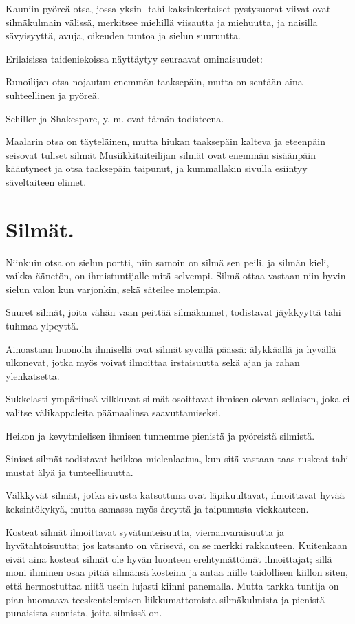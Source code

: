 \documentclass[11pt, twoside, finnish, a5paper]{book}
\begin{document}
Kauniin pyöreä otsa, jossa yksin- tahi kaksinkertaiset
pystysuorat viivat ovat silmäkulmain välissä, merkitsee
miehillä viisautta ja miehuutta, ja naisilla sävyisyyttä,
avuja, oikeuden tuntoa ja sielun suuruutta.

Erilaisissa taideniekoissa näyttäytyy seuraavat ominaisuudet:

Runoilijan otsa nojautuu enemmän taaksepäin, mutta on
sentään aina suhteellinen ja pyöreä.

Schiller ja Shakespare, y. m. ovat tämän todisteena.

Maalarin otsa on täyteläinen, mutta hiukan taaksepäin
kalteva ja eteenpäin seisovat tuliset silmät
Musiikkitaiteilijan silmät ovat enemmän
 sisäänpäin
kääntyneet ja otsa taaksepäin taipunut, ja kummallakin
sivulla esiintyy säveltaiteen elimet.

\chapter*{Silmät.}

Niinkuin otsa on sielun portti, niin samoin on silmä
sen peili, ja silmän kieli, vaikka äänetön, on
ihmistuntijalle mitä selvempi. Silmä ottaa vastaan niin hyvin
sielun valon kun varjonkin, sekä säteilee molempia.

Suuret silmät, joita vähän vaan peittää silmäkannet,
todistavat jäykkyyttä tahi tuhmaa ylpeyttä.

Ainoastaan huonolla ihmisellä ovat silmät syvällä
päässä: älykkäällä ja hyvällä ulkonevat, jotka
myös voivat ilmoittaa irstaisuutta sekä ajan ja rahan ylenkatsetta.

Sukkelasti ympäriinsä vilkkuvat silmät osoittavat ihmisen
olevan sellaisen, joka ei valitse välikappaleita
päämaalinsa saavuttamiseksi.

Heikon ja kevytmielisen ihmisen tunnemme pienistä ja pyöreistä silmistä.

Siniset silmät todistavat heikkoa
mielenlaatua, kun
sitä vastaan taas ruskeat tahi mustat älyä ja tunteellisuutta.

Välkkyvät silmät, jotka sivusta katsottuna ovat läpikuultavat,
ilmoittavat hyvää keksintökykyä, mutta samassa myös äreyttä
ja taipumusta viekkauteen.

Kosteat silmät ilmoittavat syvätunteisuutta, vieraanvaraisuutta
ja hyvätahtoisuutta; jos katsanto on värisevä,
on se merkki rakkauteen. Kuitenkaan eivät aina kosteat
silmät ole hyvän luonteen erehtymättömät ilmoittajat;
sillä moni ihminen osaa pitää silmänsä kosteina ja
antaa niille taidollisen kiillon siten, että hermostuttaa
niitä usein lujasti kiinni panemalla.
 Mutta tarkka tuntija on pian huomaava teeskentelemisen liikkumattomista
silmäkulmista ja pienistä punaisista suonista, joita silmissä on.
\end{document}
